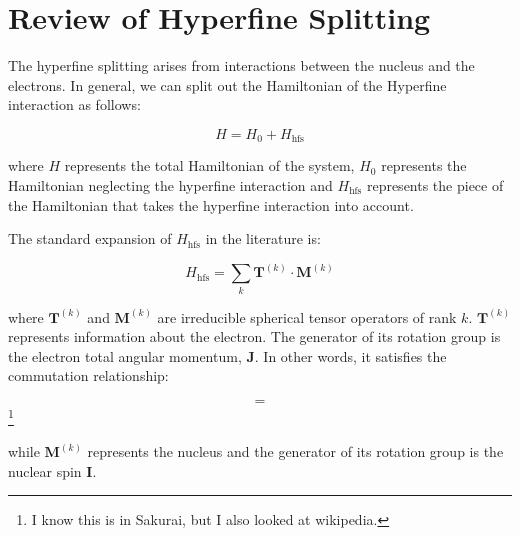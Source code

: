 \section{Review of Hyperfine Splitting}

The hyperfine splitting arises from interactions between the nucleus and the electrons. In general, we can split out the Hamiltonian of the Hyperfine interaction as follows: 

\begin{equation}
H=H_0+H_{\mathrm{hfs}}
\end{equation}

where $H$ represents the total Hamiltonian of the system, $H_0$ represents the Hamiltonian neglecting the hyperfine interaction and $H_{\mathrm{hfs}}$ represents the piece of the Hamiltonian that takes the hyperfine interaction into account. 

The standard expansion of $H_{\mathrm{hfs}}$ in the literature is:  

\begin{equation}
H_{\mathrm{hfs}}=\sum_k \mathbf{T}^{(k)} \cdot \mathbf{M}^{(k)} \label{hfs_hamiltonian_eqn}
\end{equation}
\cite{schwartz_hyperfine_expansion}
\cite{experimental_hyperfine_alkali_arimondo}
\cite{chinesePhysics}

where $\mathbf{T}^{(k)}$ and $\mathbf{M}^{(k)}$ are irreducible spherical tensor operators of rank $k$.
 $\mathbf{T}^{(k)}$ represents information about the electron.
The generator of its rotation group is the electron total angular momentum, $\mathbf{J}$. In other words, it satisfies the commutation relationship:

\begin{equation}
[\mathbf{J}_i,\mathbf{T}^{(k)}_q]=
\end{equation}
\footnote{I know this is in Sakurai, but I also looked at wikipedia.}

while $\mathbf{M}^{(k)}$ represents the nucleus and the generator of its rotation group is the nuclear spin $\mathbf{I}$.\cite{experimental_hyperfine_alkali_arimondo}\cite{schwartz_hyperfine_expansion}

